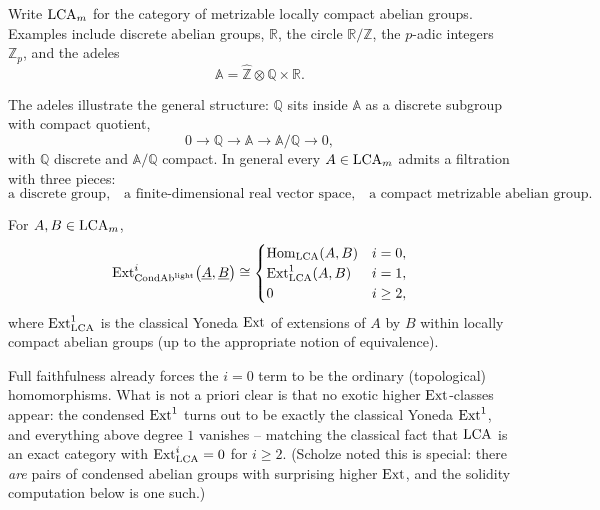 \begin{notation}
\label{not:4:lca}
Write $\mathrm{LCA}_m$ for the category of metrizable locally compact abelian groups.
Examples include discrete abelian groups, $\mathbb{R}$, the circle
$\mathbb{R}/\mathbb{Z}$, the $p$-adic integers $\mathbb{Z}_p$, and the adeles
\begin{equation*}
\mathbb{A}=\widehat{\mathbb{Z}}\otimes\mathbb{Q}\times\mathbb{R}.
\end{equation*}
\end{notation}

The adeles illustrate the general structure: $\mathbb{Q}$ sits inside $\mathbb{A}$
as a discrete subgroup with compact quotient,
\begin{equation*}
0\to\mathbb{Q}\to\mathbb{A}\to\mathbb{A}/\mathbb{Q}\to0,
\end{equation*}
with $\mathbb{Q}$ discrete and $\mathbb{A}/\mathbb{Q}$ compact. In general every
$A\in\mathrm{LCA}_m$ admits a filtration with three pieces:
\begin{equation}
\label{eq:4:lca-filtration}
\text{a discrete group,}\quad
\text{a finite-dimensional real vector space,}\quad
\text{a compact metrizable abelian group.}
\end{equation}

\begin{theorem}
\label{thm:4:lca-ext}
For $A,B\in\mathrm{LCA}_m$,
\begin{equation*}
\operatorname{Ext}^{i}_{\mathrm{CondAb}^{\mathrm{light}}}\bigl(\underline{A},\underline{B}\bigr)\cong
\begin{cases}
\operatorname{Hom}_{\mathrm{LCA}}(A,B) & i=0,\\
\operatorname{Ext}^{1}_{\mathrm{LCA}}(A,B) & i=1,\\
0 & i\geq2,
\end{cases}
\end{equation*}
where $\operatorname{Ext}^{1}_{\mathrm{LCA}}$ is the classical Yoneda $\operatorname{Ext}$ of extensions of $A$ by
$B$ within locally compact abelian groups (up to the appropriate notion of
equivalence).
\end{theorem}

Full faithfulness already forces the $i=0$ term to be the ordinary
(topological) homomorphisms. What is not a priori clear is that no exotic higher
$\operatorname{Ext}$-classes appear: the condensed $\operatorname{Ext}^1$ turns out to be exactly the
classical Yoneda $\operatorname{Ext}^1$, and everything above degree $1$ vanishes -- matching
the classical fact that $\mathrm{LCA}$ is an exact category with $\operatorname{Ext}^i_{\mathrm{LCA}}=0$ for
$i\geq2$. (Scholze noted this is special: there \emph{are} pairs of condensed
abelian groups with surprising higher $\operatorname{Ext}$, and the solidity computation below
is one such.)

